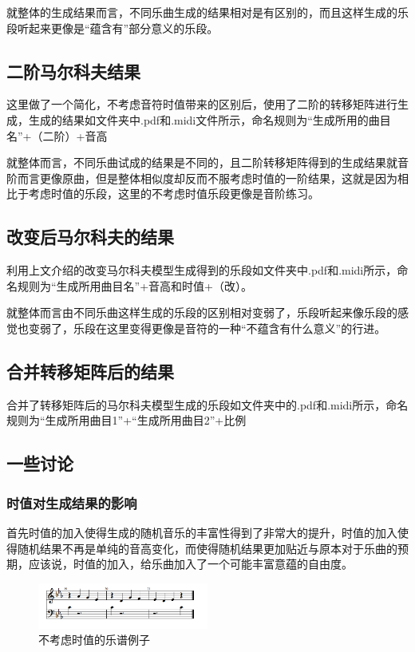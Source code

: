 \documentclass[12pt, a4paper, oneside]{ctexart}
\begin{document}
    就整体的生成结果而言，不同乐曲生成的结果相对是有区别的，而且这样生成的乐段听起来更像是“蕴含有”部分意义的乐段。
    
    \subsection{二阶马尔科夫结果}
    这里做了一个简化，不考虑音符时值带来的区别后，使用了二阶的转移矩阵进行生成，生成的结果如文件夹中.pdf和.midi文件所示，命名规则为“生成所用的曲目名”+（二阶）+音高
    
    就整体而言，不同乐曲试成的结果是不同的，且二阶转移矩阵得到的生成结果就音阶而言更像原曲，但是整体相似度却反而不服考虑时值的一阶结果，这就是因为相比于考虑时值的乐段，这里的不考虑时值乐段更像是音阶练习。
    
    \subsection{改变后马尔科夫的结果}
    利用上文介绍的改变马尔科夫模型生成得到的乐段如文件夹中.pdf和.midi所示，命名规则为“生成所用曲目名”+音高和时值+（改）。
    
    就整体而言由不同乐曲这样生成的乐段的区别相对变弱了，乐段听起来像乐段的感觉也变弱了，乐段在这里变得更像是音符的一种“不蕴含有什么意义”的行进。
    
    \subsection{合并转移矩阵后的结果}
    合并了转移矩阵后的马尔科夫模型生成的乐段如文件夹中的.pdf和.midi所示，命名规则为“生成所用曲目1”+“生成所用曲目2”+比例
    
    \subsection{一些讨论}
    \subsubsection{时值对生成结果的影响}
    首先时值的加入使得生成的随机音乐的丰富性得到了非常大的提升，时值的加入使得随机结果不再是单纯的音高变化，而使得随机结果更加贴近与原本对于乐曲的预期，应该说，时值的加入，给乐曲加入了一个可能丰富意蕴的自由度。
    
    \begin{figure}[htbp]
    	\centering
    	\includegraphics[width = 0.5\textwidth]{eg2}
    	\caption{不考虑时值的乐谱例子}
    \end{figure}
    
\end{document}
